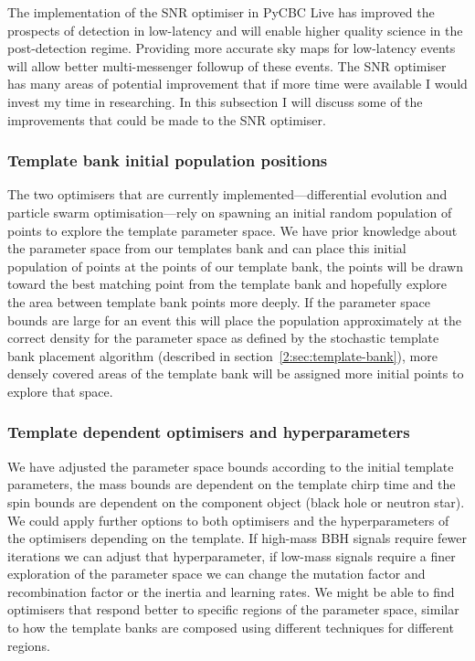 The implementation of the SNR optimiser in PyCBC Live has improved the prospects of \gwadj detection in low-latency and will enable higher quality science in the post-detection regime. Providing more accurate sky maps for low-latency events will allow better multi-messenger followup of these events. The SNR optimiser has many areas of potential improvement that if more time were available I would invest my time in researching. In this subsection I will discuss some of the improvements that could be made to the SNR optimiser.

\subsubsection{Template bank initial population positions}

% 

The two optimisers that are currently implemented---differential evolution and particle swarm optimisation---rely on spawning an initial random population of points to explore the template parameter space. We have prior knowledge about the parameter space from our templates bank and can place this initial population of points at the points of our template bank, the points will be drawn toward the best matching point from the template bank and hopefully explore the area between template bank points more deeply. If the parameter space bounds are large for an event this will place the population approximately at the correct density for the parameter space as defined by the stochastic template bank placement algorithm (described in section~\ref{2:sec:template-bank}), more densely covered areas of the template bank will be assigned more initial points to explore that space.

\subsubsection{Template dependent optimisers and hyperparameters}

We have adjusted the parameter space bounds according to the initial template parameters, the mass bounds are dependent on the template chirp time and the spin bounds are dependent on the component object (black hole or neutron star). We could apply further options to both optimisers and the hyperparameters of the optimisers depending on the template. If high-mass BBH signals require fewer iterations we can adjust that hyperparameter, if low-mass signals require a finer exploration of the parameter space we can change the mutation factor and recombination factor or the inertia and learning rates. We might be able to find optimisers that respond better to specific regions of the parameter space, similar to how the template banks are composed using different techniques for different regions.


